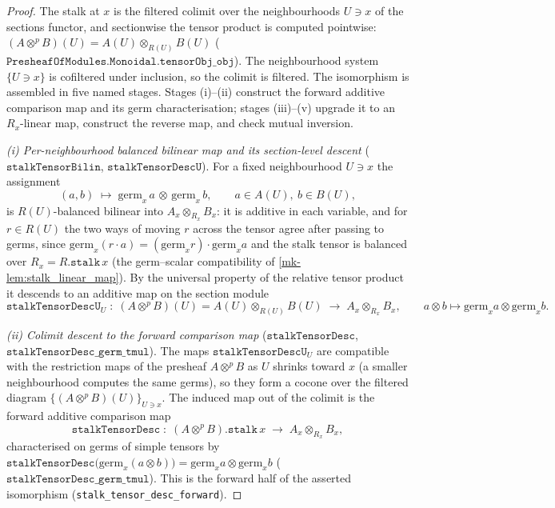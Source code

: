 \begin{proof}
  The stalk at \(x\) is the filtered colimit over the neighbourhoods \(U \ni x\) of
  the sections functor, and sectionwise the tensor product is computed pointwise:
  \((A \otimes^{p} B)(U) = A(U) \otimes_{R(U)} B(U)\)
  (\(\mathtt{PresheafOfModules.Monoidal.tensorObj\_obj}\)). The neighbourhood system
  \(\{U \ni x\}\) is cofiltered under inclusion, so the colimit is filtered. The
  isomorphism is assembled in five named stages. Stages (i)--(ii) construct the
  forward additive comparison map and its germ characterisation; stages (iii)--(v)
  upgrade it to an \(R_x\)-linear map, construct the reverse map, and check mutual
  inversion.

  \emph{(i) Per-neighbourhood balanced bilinear map and its section-level descent}
  (\(\mathtt{stalkTensorBilin}\), \(\mathtt{stalkTensorDescU}\)). For a fixed
  neighbourhood \(U \ni x\) the assignment
  \[
    (a, b) \;\longmapsto\; \mathrm{germ}_x\,a \,\otimes\, \mathrm{germ}_x\,b,
    \qquad a \in A(U),\ b \in B(U),
  \]
  is \(R(U)\)-balanced bilinear into \(A_x \otimes_{R_x} B_x\): it is additive in each
  variable, and for \(r \in R(U)\) the two ways of moving \(r\) across the tensor agree
  after passing to germs, since \(\mathrm{germ}_x(r \cdot a) = (\mathrm{germ}_x r)
  \cdot \mathrm{germ}_x a\) and the stalk tensor is balanced over
  \(R_x = R.\mathtt{stalk}\,x\) (the germ--scalar compatibility of
  \ref{mk-lem:stalk_linear_map}). By the universal property of the relative tensor
  product it descends to an additive map on the section module
  \[
    \mathtt{stalkTensorDescU}_U \;\colon\;
      (A \otimes^{p} B)(U) = A(U) \otimes_{R(U)} B(U)
        \;\longrightarrow\; A_x \otimes_{R_x} B_x,
    \qquad a \otimes b \longmapsto \mathrm{germ}_x a \otimes \mathrm{germ}_x b.
  \]

  \emph{(ii) Colimit descent to the forward comparison map}
  (\(\mathtt{stalkTensorDesc}\), \(\mathtt{stalkTensorDesc\_germ\_tmul}\)). The
  maps \(\mathtt{stalkTensorDescU}_U\) are compatible with the restriction maps of the
  presheaf \(A \otimes^{p} B\) as \(U\) shrinks toward \(x\) (a smaller neighbourhood
  computes the same germs), so they form a cocone over the filtered diagram
  \(\{(A \otimes^{p} B)(U)\}_{U \ni x}\). The induced map out of the colimit is the
  forward additive comparison map
  \[
    \mathtt{stalkTensorDesc} \;\colon\;
      (A \otimes^{p} B).\mathtt{stalk}\,x \;\longrightarrow\; A_x \otimes_{R_x} B_x,
  \]
  characterised on germs of simple tensors by
  \(\mathtt{stalkTensorDesc}\bigl(\mathrm{germ}_x(a \otimes b)\bigr) =
  \mathrm{germ}_x a \otimes \mathrm{germ}_x b\)
  (\(\mathtt{stalkTensorDesc\_germ\_tmul}\)). This is the forward half of the asserted
  isomorphism (\texttt{stalk\_tensor\_desc\_forward}).


\end{proof}
